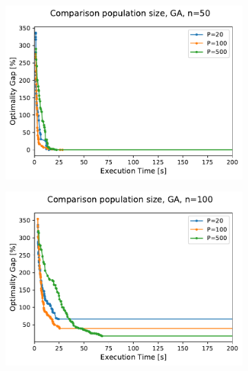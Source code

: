 \documentclass[12pt]{article}
\begin{document}
  \begin{figure}
        \centering
        \begin{subfigure}[b]{0.475\textwidth}
            \centering
            \includegraphics[width=\textwidth]{figures/ga_50_population_comparison.pdf}
            \caption%
            {{\small }}    
            \label{fig:population-a}
        \end{subfigure}
        \hfill
        \begin{subfigure}[b]{0.475\textwidth}  
            \centering 
            \includegraphics[width=\textwidth]{figures/ga_100_population_comparison.pdf}
            \caption%
            {{\small }}     
            \label{fig:population-b}
        \end{subfigure}

\end{figure}
\end{document}
